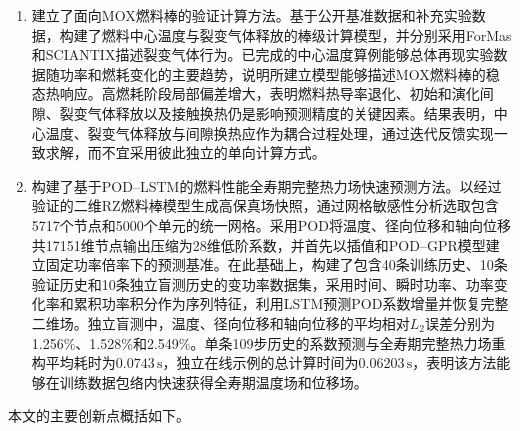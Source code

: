 \begin{enumerate}[label={（\arabic*）},leftmargin=2.8em]
	\item 建立了面向MOX燃料棒的验证计算方法。基于公开基准数据和补充实验数据，构建了燃料中心温度与裂变气体释放的棒级计算模型，并分别采用ForMas和SCIANTIX描述裂变气体行为。已完成的中心温度算例能够总体再现实验数据随功率和燃耗变化的主要趋势，说明所建立模型能够描述MOX燃料棒的稳态热响应。高燃耗阶段局部偏差增大，表明燃料热导率退化、初始和演化间隙、裂变气体释放以及接触换热仍是影响预测精度的关键因素。结果表明，中心温度、裂变气体释放与间隙换热应作为耦合过程处理，通过迭代反馈实现一致求解，而不宜采用彼此独立的单向计算方式。
	
	\item 构建了基于POD--LSTM的燃料性能全寿期完整热力场快速预测方法。以经过验证的二维RZ燃料棒模型生成高保真场快照，通过网格敏感性分析选取包含5717个节点和5000个单元的统一网格。采用POD将温度、径向位移和轴向位移共17151维节点输出压缩为28维低阶系数，并首先以插值和POD--GPR模型建立固定功率倍率下的预测基准。在此基础上，构建了包含40条训练历史、10条验证历史和10条独立盲测历史的变功率数据集，采用时间、瞬时功率、功率变化率和累积功率积分作为序列特征，利用LSTM预测POD系数增量并恢复完整二维场。独立盲测中，温度、径向位移和轴向位移的平均相对$L_2$误差分别为1.256\%、1.528\%和2.549\%。单条109步历史的系数预测与全寿期完整热力场重构平均耗时为$0.0743\,\mathrm{s}$，独立在线示例的总计算时间为$0.06203\,\mathrm{s}$，表明该方法能够在训练数据包络内快速获得全寿期温度场和位移场。
\end{enumerate}


本文的主要创新点概括如下。


